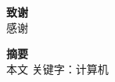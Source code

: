 \setlength{\parindent}{0em}
{\bfseries \huge 致谢}\\

\setlength{\parindent}{2em}感谢\par
\vfill

\setlength{\parindent}{0em}
{\bfseries \huge 摘要}\\


\setlength{\parindent}{2em}本文
\vfill
\setlength{\parindent}{0em}关键字：计算机
\vfill
\thispagestyle{empty}
